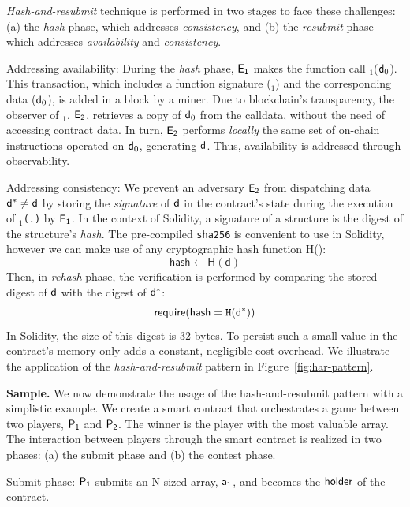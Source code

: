 \noindent
\emph{Hash-and-resubmit} technique is performed in two
stages to face these challenges: (a) the \emph{hash} phase, which addresses
\emph{consistency}, and (b) the \emph{resubmit} phase which addresses
\emph{availability} and \emph{consistency}.

\noindent \textsf{Addressing availability:} During the \emph{hash} phase,
$\mathsf{E_{1}}$ makes the function call \texttt{\proc}$_1$($\mathsf{d}_0$). This
transaction, which includes a function signature (\texttt{\proc$_1$}) and the
corresponding data ($\mathsf{d}_0$), is added in a block by a miner. Due to
blockchain's transparency, the observer of \texttt{\proc}$_1$, $\mathsf{E_{2}}$,
retrieves a copy of $\mathsf{d}_0$ from the calldata, without the need of accessing contract data. In
turn, $\mathsf{E_{2}}$ performs \emph{locally} the same set of on-chain instructions
operated on $\mathsf{d}_0$, generating $\mathsf{d}$. Thus, availability is addressed
through observability.

\noindent \textsf{Addressing consistency:} We prevent an adversary $\mathsf{E_{2}}$
from dispatching data $\mathsf{d^*}\neq\mathsf{d}$ by storing the \emph{signature} of
$\mathsf{d}$ in the contract's state during the execution of \texttt{\proc$_1$(.)} by
$\mathsf{E_{1}}$. In the context of Solidity, a signature of a structure is the
digest of the structure's \emph{hash}. The pre-compiled \texttt{sha256} is
convenient to use in Solidity, however we can make use of any cryptographic
hash function \textsf{H()}: \[\textsf{hash} \gets \textsf{H}(\textsf{d})\]
Then, in \emph{rehash} phase, the verification is performed by comparing the
stored digest of $\mathsf{d}$ with the digest of $\mathsf{d^*}$:
\[\textsf{require}(\textsf{hash} = \texttt{H}(\mathsf{d^*}))\] \noindent In Solidity,
the size of this digest is 32 bytes. To persist such a small value in the
contract's memory only adds a constant, negligible cost overhead. We illustrate
the application of the \emph{hash-and-resubmit} pattern in
Figure~\ref{fig:har-pattern}.

\noindent \textbf{Sample.} We now demonstrate the usage of the
hash-and-resubmit pattern with a simplistic example. We create a smart contract
that orchestrates a game between two players, $\mathsf{P_1}$ and $\mathsf{P_2}$. The winner is
the player with the most valuable array. The interaction between players
through the smart contract is realized in two phases: (a) the submit phase and
(b) the contest phase.

\noindent \textsf{Submit phase:} $\mathsf{P_1}$ submits an N-sized array, $\mathsf{a_1}$, and
becomes the $\mathsf{holder}$ of the contract.

